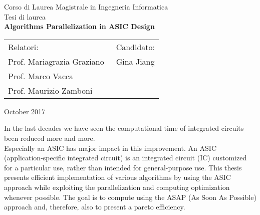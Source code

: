 \documentclass[12pt]{report}
\begin{document}
	\pagestyle{empty}
	\begin{center}
		
		Corso di Laurea Magistrale in Ingegneria Informatica\\ %
		\vspace{1cm}
		{\large Tesi di laurea}\\
		\vspace{1cm}
		{\Large \textbf{Algorithms Parallelization in ASIC Design}}\\ %
	\end{center}
	\vspace{1cm}
	\begin{tabular}{l l}
		Relatori:  &  Candidato: \\ %
		Prof. Mariagrazia Graziano \hspace{6 cm}$\,$ & Gina Jiang \\
		Prof. Marco Vacca \\
		Prof. Maurizio Zamboni
		
	\end{tabular}
	\vspace{1cm}
	\begin{center}
		October 2017 \\ %
	\end{center}
	\vspace{1cm}
	
	In the last decades we have seen the computational time of integrated circuits been reduced more and more.\\
	Especially an ASIC has major impact in this improvement. An ASIC (application-specific integrated circuit) is an integrated circuit (IC) customized for a particular use, rather than intended for general-purpose use.
	This thesis presents efficient implementation of various algorithms by using the ASIC approach while exploiting the parallelization and computing optimization whenever possible. The goal is to compute using the ASAP (As Soon As Possible) approach and, therefore, also to present a pareto efficiency. \\
	
\end{document}

